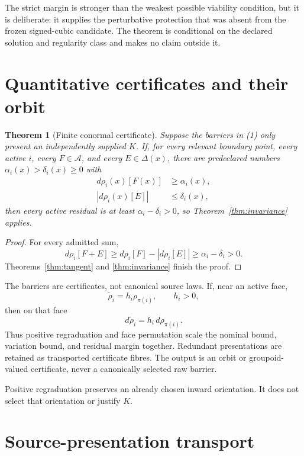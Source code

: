 \documentclass[11pt]{article}
\newtheorem{theorem}{Theorem}
\begin{document}
The strict margin is stronger than the weakest possible viability condition,
but it is deliberate: it supplies the perturbative protection that was absent
from the frozen signed-cubic candidate.  The theorem is conditional on the
declared solution and regularity class and makes no claim outside it.

\section{Quantitative certificates and their orbit}

\begin{theorem}[Finite conormal certificate]
\label{thm:certificate}
Suppose the barriers in (1) only present an independently supplied \(K\).
If, for every relevant boundary point, every active \(i\), every
\(F\in\mathcal A\), and every \(E\in\Delta(x)\), there are predeclared
numbers \(\alpha_i(x)>\delta_i(x)\geq0\) with
\begin{align}
 d\rho_i(x)[F(x)]&\geq\alpha_i(x), \\
 |d\rho_i(x)[E]|&\leq\delta_i(x),
\end{align}
then every active residual is at least
\(\alpha_i-\delta_i>0\), so
Theorem~\ref{thm:invariance} applies.
\end{theorem}

\begin{proof}
For every admitted sum,
\[
 d\rho_i[F+E]
 \geq d\rho_i[F]-|d\rho_i[E]|
 \geq\alpha_i-\delta_i>0.
\]
Theorems~\ref{thm:tangent} and \ref{thm:invariance} finish the proof.
\end{proof}

The barriers are certificates, not canonical source laws.  If, near an active
face,
\[
 \widetilde\rho_i=h_i\rho_{\pi(i)},\qquad h_i>0,
\]
then on that face
\[
 d\widetilde\rho_i=h_i\,d\rho_{\pi(i)}.
\]
Thus positive regraduation and face permutation scale the nominal bound,
variation bound, and residual margin together.  Redundant presentations are
retained as transported certificate fibres.  The output is an orbit or
groupoid-valued certificate, never a canonically selected raw barrier.

Positive regraduation preserves an already chosen inward orientation.  It
does not select that orientation or justify \(K\).

\section{Source-presentation transport}
\end{document}
